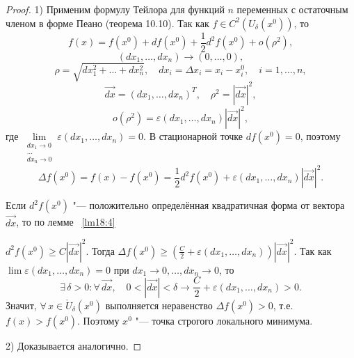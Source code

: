 \begin{proof}
1) Применим формулу Тейлора для функций $n$ переменных с остаточным членом в форме Пеано (теорема 10.10). Так как $f \in C^2(U_\delta(x^0))$, то
$$
f(x) = f(x^0) + df(x^0) + \frac{1}{2}d^2f(x^0) + o(\rho^2),
$$
$$
(dx_1, \ldots, dx_n) \to (0, \ldots, 0),
$$
$$
\rho = \sqrt{dx_1^2 + \ldots + dx_n^2}, \quad dx_i = \Delta x_i = x_i - x_i^0, \quad i = 1, \ldots, n,
$$
$$
\overrightarrow{dx} = (dx_1, \ldots, dx_n)^T, \quad \rho^2 = |\overrightarrow{dx}|^2,
$$
$$
o(\rho^2) = \varepsilon(dx_1, \ldots, dx_n)|\overrightarrow{dx}|^2,
$$
где $\lim\limits_{\substack{dx_1 \to 0 \\ \dots \\ dx_n \to 0}} \varepsilon(dx_1, \ldots, dx_n) = 0$. В стационарной точке $df(x^0) = 0$, поэтому
$$
\Delta f(x^0) = f(x) - f(x^0) = \frac{1}{2}d^2f(x^0) + \varepsilon(dx_1, \ldots, dx_n)|\overrightarrow{dx}|^2.
$$

Если $d^2f(x^0)$ "--- положительно определённая квадратичная форма от вектора $\overrightarrow{dx}$, то по лемме ~\ref{lm18:4} 

$d^2f(x^0) \ge C|\overrightarrow{dx}|^2$. Тогда $\Delta f(x^0) \ge \left(\frac{C}{2} + \varepsilon(dx_1, \ldots, dx_n)\right)|\overrightarrow{dx}|^2$. Так как $\lim \varepsilon(dx_1, \ldots, dx_n) = 0$ при $dx_1 \to 0, \ldots, dx_n \to 0$, то
$$
\exists\, \delta > 0 \colon \forall\, \overrightarrow{dx}, \quad 0 < |\overrightarrow{dx}| < \delta \longrightarrow \frac{C}{2} + \varepsilon(dx_1, \ldots, dx_n) > 0.
$$
Значит, $\forall\, x \in \mathring{U}_\delta(x^0)$ выполняется неравенство $\Delta f(x^0) > 0$, т.е. $f(x) > f(x^0)$. Поэтому $x^0$ "--- точка строгого локального минимума.

2) Доказывается аналогично.


\end{proof}
